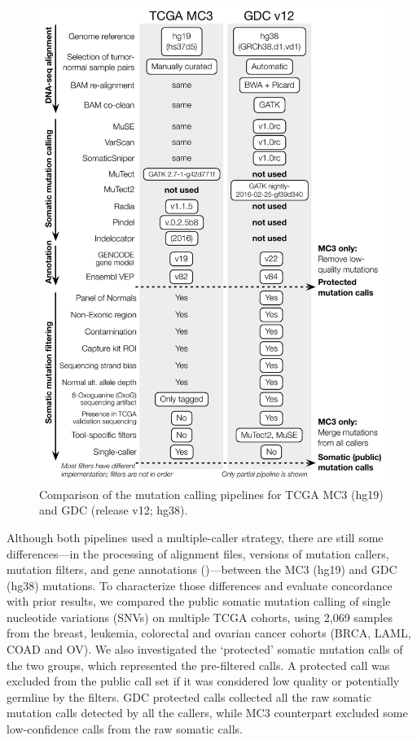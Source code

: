 \begin{figure}[tbp]
    \centering
    \includegraphics[height=0.9\textheight]{figures/chap02_mutation_pipeline_qc/mutation pipeline difference.pdf}
    \caption{Comparison of the mutation calling pipelines for TCGA MC3 (hg19) and GDC (release v12; hg38).}
    \label{fig:mut-call-qc-pipeline-comparison}
\end{figure}

Although both pipelines used a multiple-caller strategy, there are still some differences---in the processing of alignment files, versions of mutation callers, mutation filters, and gene annotations ()---between the MC3 (hg19) and GDC (hg38) mutations.
To characterize those differences and evaluate concordance with prior results, we compared the public somatic mutation calling of single nucleotide variations (SNVs) on multiple TCGA cohorts, using 2,069 samples from the breast, leukemia, colorectal and ovarian cancer cohorts (BRCA, LAML, COAD and OV). We also investigated the `protected' somatic mutation calls of the two groups, which represented the pre-filtered calls. A protected call was excluded from the public call set if it was considered low quality or potentially germline by the filters. GDC protected calls collected all the raw somatic mutation calls detected by all the callers, while MC3 counterpart excluded some low-confidence calls from the raw somatic calls.

